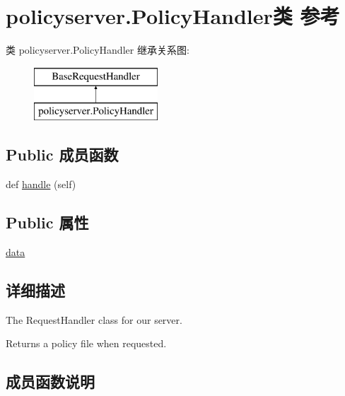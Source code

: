\hypertarget{classpolicyserver_1_1_policy_handler}{}\section{policyserver.\+Policy\+Handler类 参考}
\label{classpolicyserver_1_1_policy_handler}
类 policyserver.\+Policy\+Handler 继承关系图\+:\begin{figure}[H]
\begin{center}
\leavevmode
\includegraphics[height=2.000000cm]{classpolicyserver_1_1_policy_handler}
\end{center}
\end{figure}
\subsection*{Public 成员函数}
\begin{DoxyCompactItemize}
\item 
def \mbox{\hyperlink{classpolicyserver_1_1_policy_handler_a1b21c921ac1222fff3fbb557831450a9}{handle}} (self)
\end{DoxyCompactItemize}
\subsection*{Public 属性}
\begin{DoxyCompactItemize}
\item 
\mbox{\hyperlink{classpolicyserver_1_1_policy_handler_a764fe2f4310a00dd2a7b09e271926dfe}{data}}
\end{DoxyCompactItemize}


\subsection{详细描述}
\begin{DoxyVerb}The RequestHandler class for our server.

Returns a policy file when requested.
\end{DoxyVerb}
 

\subsection{成员函数说明}
\mbox{\label{classpolicyserver_1_1_policy_handler_a1b21c921ac1222fff3fbb557831450a9}} 
